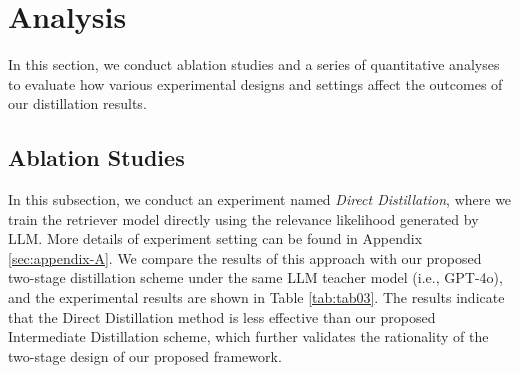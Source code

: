 \section{Analysis}
In this section, we conduct ablation studies and a series of quantitative analyses to evaluate how various experimental designs and settings affect the outcomes of our distillation results.
\label{sec:5}
\subsection{Ablation Studies}
\label{sec:5-1}
In this subsection, we conduct an experiment named \textit{Direct Distillation}, where we train the retriever model directly using the relevance likelihood generated by LLM. More details of experiment setting can be found in Appendix \ref{sec:appendix-A}.
We compare the results of this approach with our proposed two-stage distillation scheme under the same LLM teacher model (i.e., GPT-4o), and the experimental results are shown in Table \ref{tab:tab03}.
The results indicate that the Direct Distillation method is less effective than our proposed Intermediate Distillation scheme, which further validates the rationality of the two-stage design of our proposed framework. 
